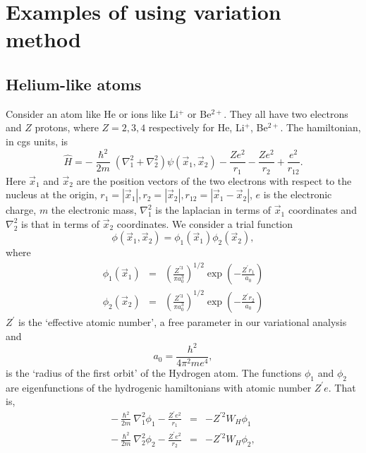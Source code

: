 \documentclass{article}
\numberwithin{equation}{section}
\begin{document}
\section{Examples of using variation method}\label{s3}
\subsection{Helium-like atoms}
Consider an atom like He or ions like Li$^{+}$ or Be$^{2+}$. They all have
two electrons and $Z$ protons, where $Z = 2, 3, 4$ respectively for He, Li$^{+}$,
Be$^{2+}$. The hamiltonian, in cgs units, is
\begin{equation}\label{s3e1}
\hat{H} = -\frac{\hslash^2}{2m}\left(\nabla_1^2 + \nabla_2^2\right)\psi(\vec{x}_1, \vec{x}_2)
- \frac{Ze^2}{r_1} - \frac{Ze^2}{r_2} + \frac{e^2}{r_{12}}.
\end{equation}
Here $\vec{x}_1$ and $\vec{x}_2$ are the position vectors of the two electrons
with respect to the nucleus at the origin, $r_1 = |\vec{x}_1|, r_2 = |\vec{x}_2|,
r_{12} = |\vec{x}_1 - \vec{x}_2|$, $e$ is the electronic charge, $m$ the 
electronic mass, $\nabla_1^2$ is the laplacian in terms of $\vec{x}_1$ coordinates 
and $\nabla_2^2$ is that in terms of $\vec{x}_2$ coordinates. We consider a
trial function
\begin{equation}\label{s3e2}
\phi(\vec{x}_1, \vec{x}_2) = \phi_1(\vec{x}_1)\phi_2(\vec{x}_2),
\end{equation}
where
\begin{eqnarray}
\phi_1(\vec{x}_1) &=& \left(\frac{Z^{\prime 3}}{\pi a_0^3}\right)^{1/2}\exp\left(-\frac{Z^\prime r_1}{a_0}\right) \\
\phi_2(\vec{x}_2) &=& \left(\frac{Z^{\prime 3}}{\pi a_0^3}\right)^{1/2}\exp\left(-\frac{Z^\prime r_2}{a_0}\right)
\end{eqnarray}
$Z^\prime$ is the `effective atomic number', a free parameter in our variational
analysis and 
\begin{equation}\label{s3e5}
a_0 = \frac{h^2}{4\pi^2 me^4},
\end{equation}
is the `radius of the first orbit' of the Hydrogen atom. The functions $\phi_1$ 
and $\phi_2$ are eigenfunctions of the hydrogenic hamiltonians with atomic
number $Z^\prime e$. That is,
\begin{eqnarray}
-\frac{\hslash^2}{2m}\nabla_1^2\phi_1 - \frac{Z^\prime e^2}{r_1} &=& -Z^{\prime 2}W_H\phi_1 \label{s3e6} \\
-\frac{\hslash^2}{2m}\nabla_2^2\phi_2 - \frac{Z^\prime e^2}{r_2} &=& -Z^{\prime 2}W_H\phi_2 \label{s3e7}, 
\end{eqnarray}
\end{document}
